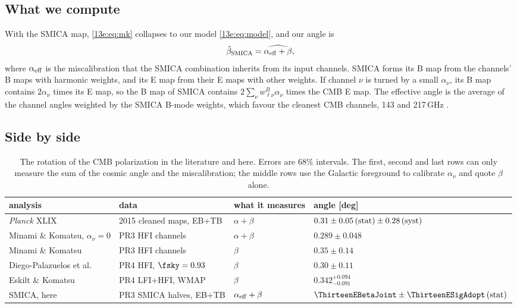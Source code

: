 \subsection{What we compute}
\label{13e:sec:what-we}

With the SMICA map, \eqref{13e:eq:mk} collapses to our model \eqref{13e:eq:model}, and our angle is
\begin{equation}
  \hat\beta_{\rm SMICA}=\widehat{\alpha_{\rm eff}+\beta},
\end{equation}
where $\alpha_{\rm eff}$ is the miscalibration that the SMICA combination inherits from its input channels.
SMICA forms its B map from the channels' B maps with harmonic weights, and its E map from their E maps with
other weights. If channel $\nu$ is turned by a small $\alpha_\nu$, its B map contains $2\alpha_\nu$ times its E map,
so the B map of SMICA contains $2\sum_\nu w^B_{\ell\nu}\alpha_\nu$ times the CMB E map. The effective angle is the
average of the channel angles weighted by the SMICA B-mode weights, which favour the cleanest CMB channels,
143 and 217\,GHz \cite{Planck2018IV}.

\subsection{Side by side}
\label{13e:sec:side}

\begin{table}[htbp]
\centering\footnotesize
\begin{tabular}{@{}llll@{}}
\toprule
analysis & data & what it measures & angle [deg]\\
\midrule
\textit{Planck} XLIX \cite{PlanckIntXLIX2016} & 2015 cleaned maps, EB+TB & $\alpha+\beta$ & $0.31\pm0.05\,({\rm stat})\pm0.28\,({\rm syst})$\\
Minami \& Komatsu, $\alpha_\nu=0$ \cite{MinamiKomatsu2020} & PR3 HFI channels & $\alpha+\beta$ & $0.289\pm0.048$\\
Minami \& Komatsu \cite{MinamiKomatsu2020} & PR3 HFI channels & $\beta$ & $0.35\pm0.14$\\
Diego-Palazuelos et al.\ \cite{DiegoPalazuelos2022} & PR4 HFI, $\fsky=0.93$ & $\beta$ & $0.30\pm0.11$\\
Eskilt \& Komatsu \cite{EskiltKomatsu2022} & PR4 LFI+HFI, WMAP & $\beta$ & $0.342^{+0.094}_{-0.091}$\\
SMICA, here & PR3 SMICA halves, EB+TB & $\alpha_{\rm eff}+\beta$ & $\ThirteenEBetaJoint\pm\ThirteenESigAdopt\,({\rm stat})$\\
\bottomrule
\end{tabular}
\caption{The rotation of the CMB polarization in the literature and here. Errors are $68\%$ intervals. The
first, second and last rows can only measure the sum of the cosmic angle and the miscalibration; the
middle rows use the Galactic foreground to calibrate $\alpha_\nu$ and quote $\beta$ alone.}
\label{13e:tab:published}
\end{table}

